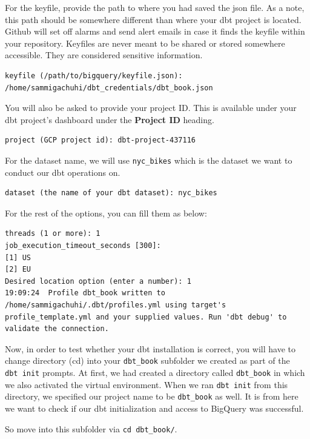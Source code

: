 \documentclass[
]{book}
\begin{document}
For the keyfile, provide the path to where you had saved the json file. As a note, this path should be somewhere different than where your dbt project is located. Github will set off alarms and send alert emails in case it finds the keyfile within your repository. Keyfiles are never meant to be shared or stored somewhere accessible. They are considered sensitive information.

\begin{verbatim}
keyfile (/path/to/bigquery/keyfile.json): /home/sammigachuhi/dbt_credentials/dbt_book.json
\end{verbatim}

You will also be asked to provide your project ID. This is available under your dbt project's dashboard under the \textbf{Project ID} heading.

\begin{verbatim}
project (GCP project id): dbt-project-437116
\end{verbatim}

For the dataset name, we will use \texttt{nyc\_bikes} which is the dataset we want to conduct our dbt operations on.

\begin{verbatim}
dataset (the name of your dbt dataset): nyc_bikes
\end{verbatim}

For the rest of the options, you can fill them as below:

\begin{verbatim}
threads (1 or more): 1
job_execution_timeout_seconds [300]: 
[1] US
[2] EU
Desired location option (enter a number): 1
19:09:24  Profile dbt_book written to /home/sammigachuhi/.dbt/profiles.yml using target's profile_template.yml and your supplied values. Run 'dbt debug' to validate the connection.
\end{verbatim}

Now, in order to test whether your dbt installation is correct, you will have to change directory (cd) into your \texttt{dbt\_book} subfolder we created as part of the \texttt{dbt\ init} prompts. At first, we had created a directory called \texttt{dbt\_book} in which we also activated the virtual environment. When we ran \texttt{dbt\ init} from this directory, we specified our project name to be \texttt{dbt\_book} as well. It is from here we want to check if our dbt initialization and access to BigQuery was successful.

So move into this subfolder via \texttt{cd\ dbt\_book/}.
\end{document}
